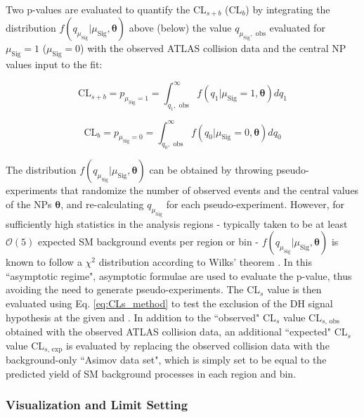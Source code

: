 Two p-values are evaluated to quantify the CL\(_{s+b}\) (CL\(_b\)) by integrating the distribution \(f(q_{\mu_\text{Sig}}|\mu_\text{Sig}, \boldsymbol{\theta})\) above (below) the value \(q_{\mu_\text{Sig},\text{ obs}}\) evaluated for \(\mu_\text{Sig}=1\) (\(\mu_\text{Sig}=0\)) with the observed ATLAS collision data and the central NP values input to the fit:

\begin{equation}
\label{eq:pvalue_CLs_b}
\text{CL}_{s+b} = p_{\mu_\text{Sig}=1} = \int_{q_{1},\text{ obs}}^\infty f(q_{1}|\mu_\text{Sig}=1, \boldsymbol{\theta})dq_{1}
\end{equation}

\begin{equation}
\label{eq:pvalue_CLb}
\text{CL}_{b} = p_{\mu_\text{Sig}=0} = \int_{q_0,\text{ obs}}^{\infty} f(q_{0}|\mu_\text{Sig}=0, \boldsymbol{\theta})dq_{0}
\end{equation}

The distribution \(f(q_{\mu_\text{Sig}}|\mu_\text{Sig}, \boldsymbol{\theta})\) can be obtained by throwing pseudo-experiments that randomize the number of observed events and the central values of the NPs \(\boldsymbol{\theta}\), and re-calculating \(q_{\mu_\text{Sig}}\) for each pseudo-experiment. However, for sufficiently high statistics in the analysis regions - typically taken to be at least \(\mathcal{O}(5)\) expected SM background events per region or bin - \(f(q_{\mu_\text{Sig}}|\mu_\text{Sig}, \boldsymbol{\theta})\) is known to follow a \(\chi^2\) distribution according to Wilks' theorem \cite{Wilks_1938}. In this ``asymptotic regime", asymptotic formulae \cite{Cowan_2011} are used to evaluate the p-value, thus avoiding the need to generate pseudo-experiments. The CL\(_s\) value is then evaluated using Eq. \ref{eq:CLs_method}  to test the exclusion of the DH signal hypothesis at the given \ms and \mZp. In addition to the ``observed" CL\(_s\) value CL\(_{s\text{, obs}}\) obtained with the observed ATLAS collision data, an additional ``expected" CL\(_s\) value CL\(_{s\text{, exp}}\) is evaluated by replacing the observed collision data with the background-only ``Asimov data set", which is simply set to be equal to the predicted yield of SM background processes in each region and bin.

\subsubsection{Visualization and Limit Setting}

